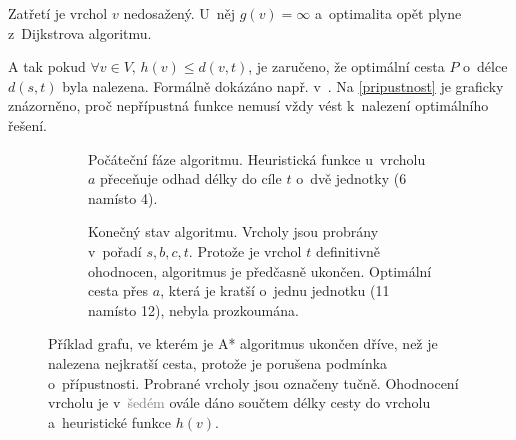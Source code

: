 Zatřetí je vrchol \(v\) nedosažený. U~něj \(g(v) = \infty\) a~optimalita opět plyne z~Dijkstrova algoritmu. 

A tak pokud $\forall v\in V,\, h(v) \leq d(v,t)$, je zaručeno, že optimální cesta \(P\) o~délce \(d(s,t)\) byla nalezena. Formálně dokázáno např. v~\cite{PearlHeuristics}. Na \autoref{pripustnost} je graficky znázorněno, proč nepřípustná funkce nemusí vždy vést k~nalezení optimálního řešení.


\begin{figure}[htbp]
	\centering
	\begin{subfigure}[b]{1\textwidth}
		\centering
		\pripustnostOne
		\caption{Počáteční fáze algoritmu. Heuristická funkce u~vrcholu \(a\) přeceňuje odhad délky do cíle \(t\) o~dvě jednotky (6 namísto 4).}
        \label{pripustnostOne}
	\end{subfigure}

	\vspace{1em}
	
	\begin{subfigure}[b]{1\textwidth}
		\centering
		\pripustnostTwo
		\caption{Konečný stav algoritmu. Vrcholy jsou probrány v~pořadí \(s, b, c, t\). Protože je vrchol \(t\) definitivně ohodnocen, algoritmus je předčasně ukončen. Optimální cesta přes \(a\), která je kratší o~jednu jednotku (11 namísto 12), nebyla prozkoumána.}
        \label{pripustnostTwo}
	\end{subfigure}

	\caption[Porušení podmínky o~přípustnosti vede k~suboptimálnímu výsledku A*.]{Příklad grafu, ve kterém je A* algoritmus ukončen dříve, než je nalezena nejkratší cesta, protože je porušena podmínka o~přípustnosti. Probrané vrcholy jsou označeny tučně. Ohodnocení vrcholu je v~\textcolor{gray}{šedém} ovále dáno součtem délky cesty do vrcholu a~heuristické funkce \(h(v)\).}
	\label{pripustnost}
\end{figure}

